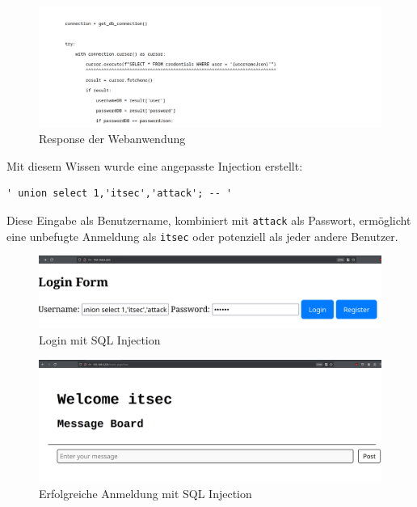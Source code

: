 \documentclass[
    a4paper,
    pagesize,
	pdftex,
    12pt,
]{scrartcl}
\begin{document}
\begin{figure}[H]
	\centering
	\includegraphics[width=15cm]{sql-login-error-response.png}
	\caption{Response der Webanwendung}
	\label{fig:sql-login-error-response}
\end{figure}

\noindent Mit diesem Wissen wurde eine angepasste Injection erstellt:
\begin{lstlisting}[breaklines]
	' union select 1,'itsec','attack'; -- '
\end{lstlisting}
Diese Eingabe als Benutzername, kombiniert mit \lstinline|attack| als Passwort, ermöglicht eine unbefugte Anmeldung als \lstinline|itsec| oder potenziell als jeder andere Benutzer.

\begin{figure}[H]
	\centering
	\includegraphics[width=15cm]{sql-injection-login-attempt.png}
	\caption{Login mit SQL Injection}
	\label{fig:sql-injection-login-attempt}
\end{figure}

\begin{figure}[H]
	\centering
	\includegraphics[width=15cm]{sql-injection-login-success.png}
	\caption{Erfolgreiche Anmeldung mit SQL Injection}
	\label{fig:sql-injection-login-success}
\end{figure}
\end{document}

